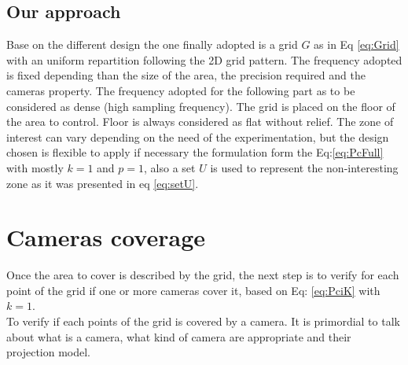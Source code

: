 \begin{table}[!h]
 \caption{Sum-up of the grid map.}\label{tab:mapSumUp}
\end{table}	
 
 
\subsection{Our approach}
 Base on the different design the one finally adopted is a grid $G$ as in Eq \ref{eq:Grid} with an uniform repartition following the 2D grid pattern. The frequency adopted is fixed depending than the size of the area, the precision required and the cameras property. The frequency adopted for the following part as to be considered as dense (high sampling frequency).
  The grid is placed on the floor of the area to control. Floor is always considered as flat without relief. The zone of interest can vary depending on the need of the experimentation, but the design chosen is flexible to apply if necessary the formulation form the Eq:\ref{eq:PcFull} with mostly $k=1$ and $p=1$, also a set $U$ is used to represent the non-interesting zone as it was presented in eq \ref{eq:setU}.

\section{ Cameras coverage}\label{sec:CamerasCoverage}


Once the area to cover is described by the grid, the next step is to verify for each point of the grid if one or more cameras cover it, based on Eq: \ref{eq:PciK} with $k=1$.\\
To verify if each points of the grid is covered by a camera. It is primordial to talk about what is a camera, what kind of camera are appropriate and their projection model. 

